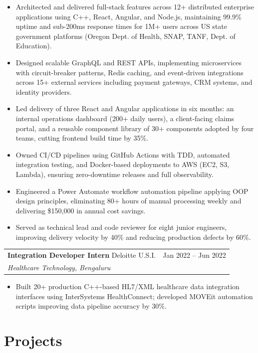 \documentclass[10pt,letterpaper]{article}
\makeatletter
\newcommand{\jobheader}[4]{%
  \begin{tabularx}{\textwidth}{@{}Xr@{}}
    \textbf{#1} {\color{accent}\textbar{} #2} & {\color{accent}#3} \\
    \textit{#4} & \\
  \end{tabularx}\vspace{2pt}
}
\makeatother
\begin{document}
\begin{itemize}
  \item Architected and delivered full-stack features across 12+ distributed
        enterprise applications using C++, React, Angular, and Node.js,
        maintaining 99.9\% uptime and sub-200ms response times for 1M+ users
        across US state government platforms (Oregon Dept. of Health, SNAP,
        TANF, Dept. of Education).
  \item Designed scalable GraphQL and REST APIs, implementing
        microservices with circuit-breaker patterns, Redis caching, and
        event-driven integrations across 15+ external services including payment
        gateways, CRM systems, and identity providers.
  \item Led delivery of three React and Angular applications in six months: an
        internal operations dashboard (200+ daily users), a client-facing claims
        portal, and a reusable component library of 30+ components adopted by
        four teams, cutting frontend build time by 35\%.
  \item Owned CI/CD pipelines using GitHub Actions with TDD, automated
        integration testing, and Docker-based deployments to AWS (EC2, S3,
        Lambda), ensuring zero-downtime releases and full observability.
  \item Engineered a Power Automate workflow automation pipeline applying OOP
        design principles, eliminating 80+ hours of manual processing weekly
        and delivering \$150,000 in annual cost savings.
  \item Served as technical lead and code reviewer for eight junior engineers,
        improving delivery velocity by 40\% and reducing production defects by 60\%.
\end{itemize}

\vspace{4pt}

\jobheader{Integration Developer Intern}{Deloitte U.S.I.}{Jan 2022 -- Jun 2022}{Healthcare Technology, Bengaluru}

\begin{itemize}
  \item Built 20+ production C++-based HL7/XML healthcare data integration
        interfaces using InterSystems HealthConnect; developed MOVEit
        automation scripts improving data pipeline accuracy by 30\%.
\end{itemize}

\section*{Projects}
\end{document}
